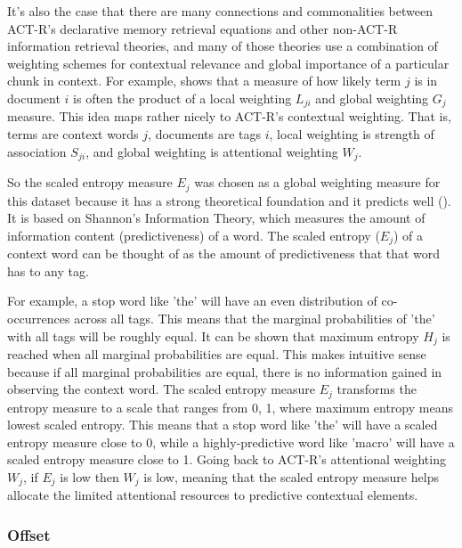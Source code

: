 \documentclass[10pt,letterpaper]{article}
\begin{document}
It's also the case that there are many connections and commonalities between ACT-R's declarative memory retrieval equations and other non-ACT-R information retrieval theories,
and many of those theories use a combination of weighting schemes for contextual relevance and global importance of a particular chunk in context.
For example,  shows that a measure of how likely term $j$ is in document $i$ is often the product of a local weighting $L_{ji}$ and global weighting $G_{j}$ measure.
This idea maps rather nicely to ACT-R's contextual weighting.
That is, terms are context words $j$, documents are tags $i$, local weighting is strength of association $S_{ji}$, and global weighting is attentional weighting $W_{j}$.

So the scaled entropy measure $E_{j}$ was chosen as a global weighting measure for this dataset because it has a strong theoretical foundation and it predicts well ().
It is based on Shannon's Information Theory, which measures the amount of information content (predictiveness) of a word.
The scaled entropy ($E_{j}$) of a context word can be thought of as the amount of predictiveness that that word has to any tag.

For example, a stop word like 'the' will have an even distribution of co-occurrences across all tags.
This means that the marginal probabilities of 'the' with all tags will be roughly equal.
It can be shown that maximum entropy $H_{j}$ is reached when all marginal probabilities are equal.
This makes intuitive sense because if all marginal probabilities are equal, there is no information gained in observing the context word.
The scaled entropy measure $E_{j}$ transforms the entropy measure to a scale that ranges from 0, 1, where maximum entropy means lowest scaled entropy.
This means that a stop word like 'the' will have a scaled entropy measure close to 0, while a highly-predictive word like 'macro' will have a scaled entropy measure close to 1.
Going back to ACT-R's attentional weighting $W_{j}$, if $E_{j}$ is low then $W_{j}$ is low, meaning that the scaled entropy measure helps allocate the limited attentional resources to predictive contextual elements.

\subsubsection{Offset}
\end{document}
